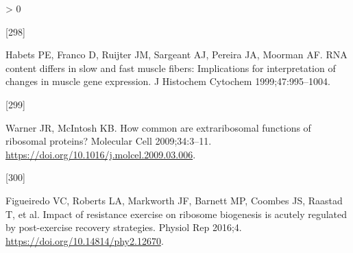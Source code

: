\documentclass[twoside,10pt]{gihclass} %
\newlength{\cslhangindent}
\newlength{\csllabelwidth}
\newenvironment{CSLReferences}[3] %
 {%
  \setlength{\parindent}{0pt}
  \ifodd #1 \everypar{\setlength{\hangindent}{\cslhangindent}}\ignorespaces\fi
  \ifnum #2 > 0
  \setlength{\parskip}{#2\baselineskip}
  \fi
 }%
 {}
\newcommand{\CSLLeftMargin}[1]{\parbox[t]{\maxof{\widthof{#1}}{\csllabelwidth}}{#1}}
\newcommand{\CSLRightInline}[1]{\parbox[t]{\linewidth}{#1}}
\begin{document}
\begin{CSLReferences}{0}{0}
\leavevmode\hypertarget{ref-RN1707}{}%
\CSLLeftMargin{{[}298{]} }
\CSLRightInline{Habets PE, Franco D, Ruijter JM, Sargeant AJ, Pereira JA, Moorman AF. RNA content differs in slow and fast muscle fibers: Implications for interpretation of changes in muscle gene expression. J Histochem Cytochem 1999;47:995--1004.}

\leavevmode\hypertarget{ref-RN2588}{}%
\CSLLeftMargin{{[}299{]} }
\CSLRightInline{Warner JR, McIntosh KB. How common are extraribosomal functions of ribosomal proteins? Molecular Cell 2009;34:3--11. \url{https://doi.org/10.1016/j.molcel.2009.03.006}.}

\leavevmode\hypertarget{ref-RN1746}{}%
\CSLLeftMargin{{[}300{]} }
\CSLRightInline{Figueiredo VC, Roberts LA, Markworth JF, Barnett MP, Coombes JS, Raastad T, et al. Impact of resistance exercise on ribosome biogenesis is acutely regulated by post-exercise recovery strategies. Physiol Rep 2016;4. \url{https://doi.org/10.14814/phy2.12670}.}

\end{CSLReferences}

\end{document}
